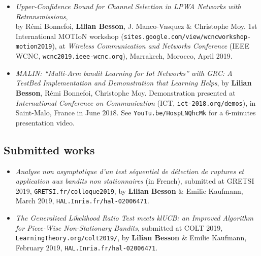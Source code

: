 \begin{itemize}

\item
    \emph{Upper-Confidence Bound for Channel Selection in LPWA Networks with Retransmissions},\\
    by Rémi Bonnefoi, \textbf{Lilian Besson}, J. Manco-Vasquez \& Christophe Moy.
    1st International MOTIoN workshop (\texttt{sites.google.com/view/wcncworkshop-motion2019}),
    at \emph{Wireless Communication and Networks Conference} (IEEE WCNC, \texttt{wcnc2019.ieee-wcnc.org}), Marrakech, Morocco, April 2019.
    \cite{Bonnefoi2019WCNC}

\item
    \emph{MALIN: ``Multi-Arm bandit Learning for Iot Networks'' with GRC: A TestBed Implementation and Demonstration that Learning Helps},
    by \textbf{Lilian Besson}, Rémi Bonnefoi, Christophe Moy.
    Demonstration presented at \emph{International Conference on Communication} (ICT, \texttt{ict-2018.org/demos}), in Saint-Malo, France in June $2018$.
    See \texttt{YouTu.be/HospLNQhcMk} for a $6$-minutes presentation video.
    \cite{Besson2018ICT}

\end{itemize}


\subsection{Submitted works}

\begin{itemize}
\item
    \emph{Analyse non asymptotique d'un test séquentiel de détection de ruptures et application aux bandits non stationnaires} (in French),
    submitted at GRETSI 2019, \texttt{GRETSI.fr/colloque2019},
    by \textbf{Lilian Besson} \& Emilie Kaufmann, March $2019$,
    \texttt{HAL.Inria.fr/hal-02006471}.
    \cite{Besson2019Gretsi}

\item
    \emph{The Generalized Likelihood Ratio Test meets klUCB: an Improved Algorithm for Piece-Wise Non-Stationary Bandits},
    submitted at COLT 2019, \texttt{LearningTheory.org/colt2019/},
    by \textbf{Lilian Besson} \& Emilie Kaufmann, February $2019$,
    \texttt{HAL.Inria.fr/hal-02006471}.
    \cite{Besson2019GLRT}

\end{itemize}


